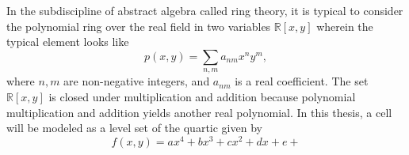 \\
\\
In the subdiscipline of abstract algebra called ring theory, it is typical to consider the polynomial ring over the real field in two variables $\mathbb{R}[x,y]$ wherein the typical element looks like
\begin{equation}
    p(x,y) = \sum_{n,m} a_{nm} x^n y^m,
\end{equation}
where $n,m$ are non-negative integers, and $a_{nm}$ is a real coefficient. The set $\mathbb{R}[x,y]$ is closed under multiplication and addition because polynomial multiplication and addition yields another real polynomial. In this thesis, a cell will be modeled as a level set of the quartic given by
\begin{equation}
    f(x,y) = ax^4 +bx^3+cx^2 +dx +e+
\end{equation}


